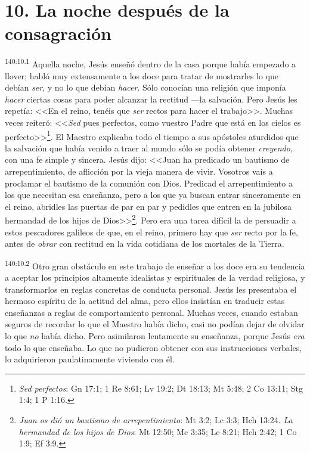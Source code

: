 \section*{10. La noche después de la consagración}
\par 
\textsuperscript{140:10.1} Aquella noche, Jesús enseñó dentro de la casa porque había empezado a llover; habló muy extensamente a los doce para tratar de mostrarles lo que debían \textit{ser}, y no lo que debían \textit{hacer}. Sólo conocían una religión que imponía \textit{hacer} ciertas cosas para poder alcanzar la rectitud ---la salvación. Pero Jesús les repetía: <<En el reino, tenéis que \textit{ser} rectos para hacer el trabajo>>. Muchas veces reiteró: <<\textit{Sed} pues perfectos, como vuestro Padre que está en los cielos es perfecto>>\footnote{\textit{Sed perfectos}: Gn 17:1; 1 Re 8:61; Lv 19:2; Dt 18:13; Mt 5:48; 2 Co 13:11; Stg 1:4; 1 P 1:16.}. El Maestro explicaba todo el tiempo a sus apóstoles aturdidos que la salvación que había venido a traer al mundo sólo se podía obtener \textit{creyendo}, con una fe simple y sincera. Jesús dijo: <<Juan ha predicado un bautismo de arrepentimiento, de aflicción por la vieja manera de vivir. Vosotros vais a proclamar el bautismo de la comunión con Dios. Predicad el arrepentimiento a los que necesitan esa enseñanza, pero a los que ya buscan entrar sinceramente en el reino, abridles las puertas de par en par y pedidles que entren en la jubilosa hermandad de los hijos de Dios>>\footnote{\textit{Juan os dió un bautismo de arrepentimiento}: Mt 3:2; Lc 3:3; Hch 13:24. \textit{La hermandad de los hijos de Dios}: Mt 12:50; Mc 3:35; Lc 8:21; Hch 2:42; 1 Co 1:9; Ef 3:9.}. Pero era una tarea difícil la de persuadir a estos pescadores galileos de que, en el reino, primero hay que \textit{ser} recto por la fe, antes de \textit{obrar} con rectitud en la vida cotidiana de los mortales de la Tierra.

\par 
\textsuperscript{140:10.2} Otro gran obstáculo en este trabajo de enseñar a los doce era su tendencia a aceptar los principios altamente idealistas y espirituales de la verdad religiosa, y transformarlos en reglas concretas de conducta personal. Jesús les presentaba el hermoso espíritu de la actitud del alma, pero ellos insistían en traducir estas enseñanzas a reglas de comportamiento personal. Muchas veces, cuando estaban seguros de recordar lo que el Maestro había dicho, casi no podían dejar de olvidar lo que \textit{no} había dicho. Pero asimilaron lentamente su enseñanza, porque Jesús \textit{era} todo lo que enseñaba. Lo que no pudieron obtener con sus instrucciones verbales, lo adquirieron paulatinamente viviendo con él.

